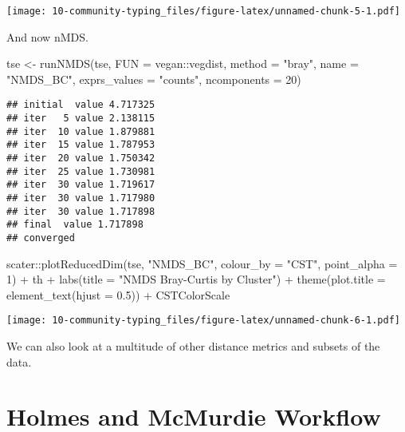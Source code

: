 \documentclass[
  oneside]{book}
\newenvironment{Shaded}{\begin{snugshade}}{\end{snugshade}}
\newcommand{\AttributeTok}[1]{\textcolor[rgb]{0.77,0.63,0.00}{#1}}
\newcommand{\DecValTok}[1]{\textcolor[rgb]{0.00,0.00,0.81}{#1}}
\newcommand{\FloatTok}[1]{\textcolor[rgb]{0.00,0.00,0.81}{#1}}
\newcommand{\FunctionTok}[1]{\textcolor[rgb]{0.00,0.00,0.00}{#1}}
\newcommand{\NormalTok}[1]{#1}
\newcommand{\OtherTok}[1]{\textcolor[rgb]{0.56,0.35,0.01}{#1}}
\newcommand{\SpecialCharTok}[1]{\textcolor[rgb]{0.00,0.00,0.00}{#1}}
\newcommand{\StringTok}[1]{\textcolor[rgb]{0.31,0.60,0.02}{#1}}
\begin{document}
\texttt{[image: 10-community-typing\_files/figure-latex/unnamed-chunk-5-1.pdf]}

And now nMDS.

\begin{Shaded}
\begin{Highlighting}[]
\NormalTok{tse  }\OtherTok{\textless{}{-}} \FunctionTok{runNMDS}\NormalTok{(tse, }\AttributeTok{FUN =}\NormalTok{ vegan}\SpecialCharTok{::}\NormalTok{vegdist, }\AttributeTok{method =} \StringTok{"bray"}\NormalTok{, }
                \AttributeTok{name =} \StringTok{"NMDS\_BC"}\NormalTok{, }\AttributeTok{exprs\_values =} \StringTok{"counts"}\NormalTok{, }\AttributeTok{ncomponents =} \DecValTok{20}\NormalTok{)}
\end{Highlighting}
\end{Shaded}

\begin{verbatim}
## initial  value 4.717325 
## iter   5 value 2.138115
## iter  10 value 1.879881
## iter  15 value 1.787953
## iter  20 value 1.750342
## iter  25 value 1.730981
## iter  30 value 1.719617
## iter  30 value 1.717980
## iter  30 value 1.717898
## final  value 1.717898 
## converged
\end{verbatim}

\begin{Shaded}
\begin{Highlighting}[]
\NormalTok{scater}\SpecialCharTok{::}\FunctionTok{plotReducedDim}\NormalTok{(tse, }\StringTok{"NMDS\_BC"}\NormalTok{, }\AttributeTok{colour\_by =} \StringTok{"CST"}\NormalTok{, }\AttributeTok{point\_alpha =} \DecValTok{1}\NormalTok{) }\SpecialCharTok{+}\NormalTok{ th }\SpecialCharTok{+} 
        \FunctionTok{labs}\NormalTok{(}\AttributeTok{title =} \StringTok{"NMDS Bray{-}Curtis by Cluster"}\NormalTok{) }\SpecialCharTok{+}
        \FunctionTok{theme}\NormalTok{(}\AttributeTok{plot.title =} \FunctionTok{element\_text}\NormalTok{(}\AttributeTok{hjust =} \FloatTok{0.5}\NormalTok{)) }\SpecialCharTok{+}\NormalTok{ CSTColorScale}
\end{Highlighting}
\end{Shaded}

\texttt{[image: 10-community-typing\_files/figure-latex/unnamed-chunk-6-1.pdf]}

We can also look at a multitude of other distance metrics and subsets of the data.

\hypertarget{holmes-and-mcmurdie-workflow}{%
\section{Holmes and McMurdie Workflow}\label{holmes-and-mcmurdie-workflow}}
\end{document}
